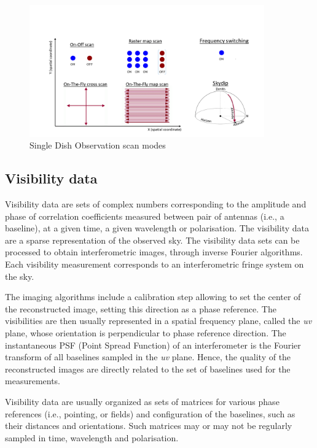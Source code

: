 \documentclass[11pt,a4paper]{ivoa}
\begin{document}
\begin{figure}[H]
\centering
\includegraphics[width=0.9\textwidth]{SingleDish.png}
\caption{Single Dish Observation scan modes}
\label{fig:SD}
\end{figure}


\subsection{Visibility data }
\label{sec:visibility}

Visibility data are sets of complex numbers corresponding to the amplitude and phase
of correlation coefficients measured between pair of antennas (i.e., a baseline), at
a given time, a given wavelength or polarisation. The visibility data are a sparse
representation of the observed sky. The visibility data sets can be processed to obtain
interferometric images, through inverse Fourier algorithms. Each visibility measurement
corresponds to an interferometric fringe system on the sky.

The imaging algorithms include a calibration step allowing to set the center of the
reconstructed image, setting this direction as a phase reference. The visibilities
are then usually represented in a spatial frequency plane, called the \emph{uv} plane,
whose orientation is perpendicular to phase reference direction. The instantaneous PSF
(Point Spread Function) of an interferometer is the Fourier transform of all baselines
sampled in the \emph{uv} plane. Hence, the quality of the reconstructed images are
directly related to the set of baselines used for the measurements.

Visibility data are usually organized as sets of matrices for various phase references
(i.e., pointing, or fields) and configuration of the baselines, such as their
distances and orientations. Such matrices may or may not be regularly sampled in time,
wavelength and polarisation.
\end{document}
